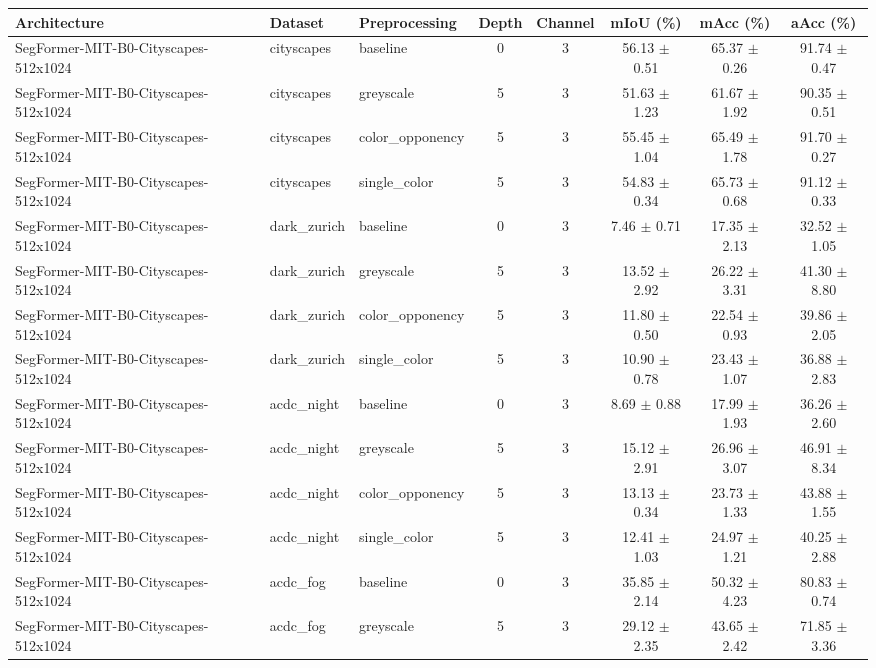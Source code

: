 \begin{tabular}{lllccccc}
\toprule
Architecture & Dataset & Preprocessing & Depth & Channel & mIoU (\%) & mAcc (\%) & aAcc (\%) \\
\midrule
SegFormer-MIT-B0-Cityscapes-512x1024 & cityscapes & baseline & 0 & 3 & 56.13 $\pm$ 0.51 & 65.37 $\pm$ 0.26 & 91.74 $\pm$ 0.47 \\
SegFormer-MIT-B0-Cityscapes-512x1024 & cityscapes & greyscale & 5 & 3 & 51.63 $\pm$ 1.23 & 61.67 $\pm$ 1.92 & 90.35 $\pm$ 0.51 \\
SegFormer-MIT-B0-Cityscapes-512x1024 & cityscapes & color_opponency & 5 & 3 & 55.45 $\pm$ 1.04 & 65.49 $\pm$ 1.78 & 91.70 $\pm$ 0.27 \\
SegFormer-MIT-B0-Cityscapes-512x1024 & cityscapes & single_color & 5 & 3 & 54.83 $\pm$ 0.34 & 65.73 $\pm$ 0.68 & 91.12 $\pm$ 0.33 \\
SegFormer-MIT-B0-Cityscapes-512x1024 & dark_zurich & baseline & 0 & 3 & 7.46 $\pm$ 0.71 & 17.35 $\pm$ 2.13 & 32.52 $\pm$ 1.05 \\
SegFormer-MIT-B0-Cityscapes-512x1024 & dark_zurich & greyscale & 5 & 3 & 13.52 $\pm$ 2.92 & 26.22 $\pm$ 3.31 & 41.30 $\pm$ 8.80 \\
SegFormer-MIT-B0-Cityscapes-512x1024 & dark_zurich & color_opponency & 5 & 3 & 11.80 $\pm$ 0.50 & 22.54 $\pm$ 0.93 & 39.86 $\pm$ 2.05 \\
SegFormer-MIT-B0-Cityscapes-512x1024 & dark_zurich & single_color & 5 & 3 & 10.90 $\pm$ 0.78 & 23.43 $\pm$ 1.07 & 36.88 $\pm$ 2.83 \\
SegFormer-MIT-B0-Cityscapes-512x1024 & acdc_night & baseline & 0 & 3 & 8.69 $\pm$ 0.88 & 17.99 $\pm$ 1.93 & 36.26 $\pm$ 2.60 \\
SegFormer-MIT-B0-Cityscapes-512x1024 & acdc_night & greyscale & 5 & 3 & 15.12 $\pm$ 2.91 & 26.96 $\pm$ 3.07 & 46.91 $\pm$ 8.34 \\
SegFormer-MIT-B0-Cityscapes-512x1024 & acdc_night & color_opponency & 5 & 3 & 13.13 $\pm$ 0.34 & 23.73 $\pm$ 1.33 & 43.88 $\pm$ 1.55 \\
SegFormer-MIT-B0-Cityscapes-512x1024 & acdc_night & single_color & 5 & 3 & 12.41 $\pm$ 1.03 & 24.97 $\pm$ 1.21 & 40.25 $\pm$ 2.88 \\
SegFormer-MIT-B0-Cityscapes-512x1024 & acdc_fog & baseline & 0 & 3 & 35.85 $\pm$ 2.14 & 50.32 $\pm$ 4.23 & 80.83 $\pm$ 0.74 \\
SegFormer-MIT-B0-Cityscapes-512x1024 & acdc_fog & greyscale & 5 & 3 & 29.12 $\pm$ 2.35 & 43.65 $\pm$ 2.42 & 71.85 $\pm$ 3.36 \\

\end{tabular}
